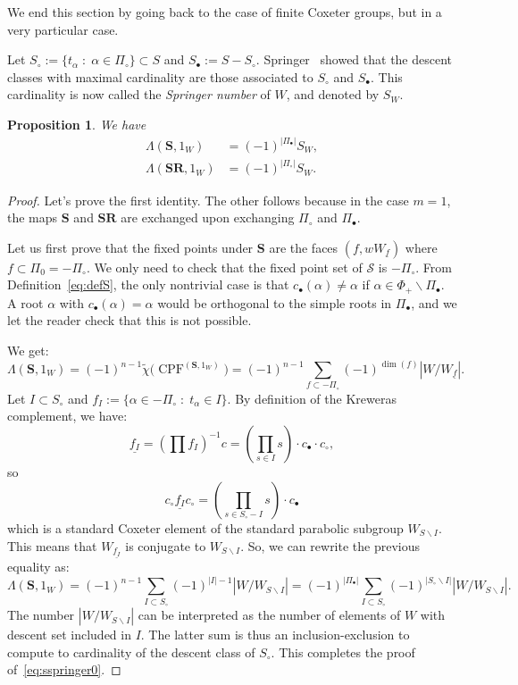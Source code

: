 \documentclass[11pt]{article}
\newtheorem{prop}[theo]{Proposition}
\theoremstyle{definition}
\renewcommand{\SS}{\mathcal{S}}
\newcommand{\RRR}{\mathbf{R}}
\newcommand{\SSS}{\mathbf{S}}
\DeclareMathOperator{\CPF}{CPF}
\begin{document}
We end this section by going back to the case of finite Coxeter groups, but in a very particular case.  

Let $S_\circ := \{t_\alpha \;:\; \alpha \in \Pi_\circ \} \subset S$ and $S_\bullet := S - S_\circ$.  Springer~\cite{springer} showed that the descent classes with maximal cardinality are those associated to $S_\circ$ and $S_\bullet$.  This cardinality is now called the {\it Springer number} of $W$, and denoted by $S_W$.


\begin{prop} \label{prop:springer}
    We have 
    \begin{align} \label{eq:sspringer0}
        \Lambda(\SSS , 1_W )
            &=
        (-1)^{|\Pi_\bullet| } S_W, \\
        \Lambda(\SSS\RRR , 1_W )
            &=
        (-1)^{|\Pi_\circ| } S_W.        
    \end{align}
\end{prop}

\begin{proof}
    Let's prove the first identity. The other follows because in the case $m=1$, the maps $\SSS$ and $\SSS\RRR$ are exchanged upon exchanging $\Pi_\circ$ and $\Pi_\bullet$.

    Let us first prove that the fixed points under $\SSS$ are the faces $(f,w W_{\underline{f}})$ where $f \subset \Pi_0 = -\Pi_\circ$.  We only need to check that the fixed point set of $\SS$ is $-\Pi_\circ$.  From Definition~\ref{eq:defS}, the only nontrivial case is that $c_\bullet(\alpha) \neq \alpha$ if $\alpha\in \Phi_+ \backslash \Pi_\bullet$.  A root $\alpha$ with $c_\bullet(\alpha)=\alpha$ would be orthogonal to the simple roots in $\Pi_\bullet$, and we let the reader check that this is not possible.      
    
    We get:
    \[
        \Lambda(\SSS , 1_W )
            =
        (-1)^{n-1} \tilde\chi\big( \CPF^{(\SSS,1_W)} \big)
            =
        (-1)^{n-1}
        \sum_{f \subset -\Pi_\circ} (-1)^{\dim(f)} | W/W_{\underline{f}}|.  
    \]
    Let $I \subset S_\circ$ and $f_I:=\{\alpha\in -\Pi_\circ \;:\; t_\alpha\in I\} $.  By definition of the Kreweras complement, we have:
    \[ 
        \underline{f_I}
            =
        (\prod f_I)^{-1} c
            =
        (\prod_{s\in I} s) \cdot c_\bullet \cdot c_\circ,
    \]
    so
    \[
        c_\circ \underline{f_I} c_\circ
            =
        (\prod_{s \in S_\circ - I} s) \cdot c_\bullet
    \]
    which is a standard Coxeter element of the standard parabolic subgroup $W_{S\backslash I}$.  This means that $W_{\underline{f_I}}$ is conjugate to $W_{S\backslash I}$.  So, we can rewrite the previous equality as:
    \[
        \Lambda(\SSS , 1_W )
            =
        (-1)^{n-1} \sum_{I \subset S_\circ} (-1)^{|I|-1} | W/W_{S\backslash I} |
            =
        (-1)^{|\Pi_\bullet|}
        \sum_{I \subset S_\circ} (-1)^{|S_\circ \backslash I|} | W/W_{S\backslash I} |.
    \]
    The number $| W/W_{S\backslash I} |$ can be interpreted as the number of elements of $W$ with descent set included in $I$.  The latter sum is thus an inclusion-exclusion to compute to cardinality of the descent class of $S_\circ$. This completes the proof of~\eqref{eq:sspringer0}.
\end{proof}
\end{document}

